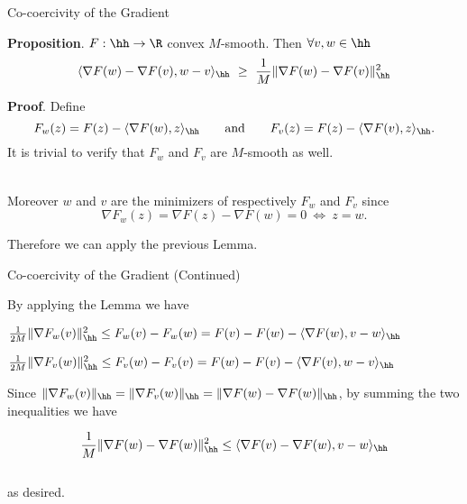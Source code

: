 \documentclass[10pt,mathserif]{beamer}
\begin{document}
\begin{frame}{Co-coercivity of the Gradient}

{\bf Proposition}. $F:\hh\to\R$ convex $M$-smooth. Then $\forall v,w\in\hh$
$$
  \langle \nabla F(w) - \nabla F(v), w - v\rangle_\hh ~\geq~ \frac{1}{M}\|\nabla F(w) - \nabla F(v)\|_\hh^2
$$

{\bf Proof}. Define
$$
F_w(z) = F(z) - \langle \nabla F(w),z\rangle_\hh \qquad \textrm{and} \qquad F_v(z) = F(z) - \langle \nabla F(v),z\rangle_\hh.
$$
%
It is trivial to verify that $F_w$ and $F_v$ are $M$-smooth as well. 

\ \\ 
Moreover $w$ and $v$ are the minimizers of respectively $F_w$ and $F_v$ since
$$
\nabla F_w(z) = \nabla F(z) - \nabla F(w) = 0 ~ \Longleftrightarrow ~ z = w.
$$

Therefore we can apply the previous Lemma. 

\end{frame}

\begin{frame}{Co-coercivity of the Gradient (Continued)}

By applying the Lemma we have 
\vfill
\bi
  \item $\frac{1}{2M}\|\nabla F_w(v)\|_\hh^2 \leq F_w(v) - F_w(w) = F(v) - F(w) - \langle \nabla F(w),v-w\rangle_\hh $
  \vfill
  \item $\frac{1}{2M}\|\nabla F_v(w)\|_\hh^2 \leq F_v(w) - F_v(v) = F(w) - F(v) - \langle \nabla F(v),w-v\rangle_\hh $
\ei
\vfill

Since $\|\nabla F_w(v)\|_\hh = \|\nabla F_v(w)\|_\hh = \|\nabla F(w) - \nabla F(w)\|_\hh$, by summing the two inequalities we have 

$$
\frac{1}{M}\|\nabla F(w) - \nabla F(w)\|_\hh^2 \leq \langle \nabla F(v) - \nabla F(w), v- w\rangle_\hh
$$
\ \\
as desired.

\end{frame}
\end{document}
